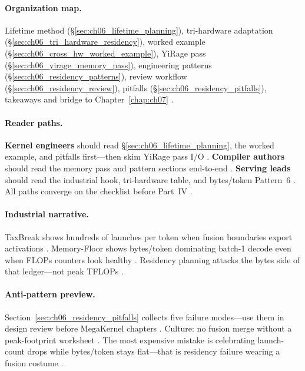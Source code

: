 \paragraph{Organization map.}
Lifetime method (\S\ref{sec:ch06_lifetime_planning}), tri-hardware adaptation (\S\ref{sec:ch06_tri_hardware_residency}), worked example (\S\ref{sec:ch06_cross_hw_worked_example}), YiRage pass (\S\ref{sec:ch06_yirage_memory_pass}), engineering patterns (\S\ref{sec:ch06_residency_patterns}), review workflow (\S\ref{sec:ch06_residency_review}), pitfalls (\S\ref{sec:ch06_residency_pitfalls}), takeaways and bridge to Chapter~\ref{chap:ch07} \citep{patel2025llminference}.

\paragraph{Reader paths.}
\textbf{Kernel engineers} should read \S\ref{sec:ch06_lifetime_planning}, the worked example, and pitfalls first---then skim YiRage pass I/O \citep{yirage2026,dao2022flashattention}.
\textbf{Compiler authors} should read the memory pass and pattern sections end-to-end \citep{wu2024mirage,rotem2018glow,chen2020compilerbasedhardw}.
\textbf{Serving leads} should read the industrial hook, tri-hardware table, and bytes/token Pattern~6 \citep{patel2025llminference,memoryfloor2026,taxbreak2026}.
All paths converge on the checklist before Part~IV \citep{mpk2025,yirage2026}.

\paragraph{Industrial narrative.}
TaxBreak shows hundreds of launches per token when fusion boundaries export activations \citep{taxbreak2026}.
Memory-Floor shows bytes/token dominating batch-1 decode even when FLOPs counters look healthy \citep{memoryfloor2026}.
Residency planning attacks the bytes side of that ledger---not peak TFLOPs \citep{dao2022flashattention,patel2025llminference}.

\paragraph{Anti-pattern preview.}
Section~\ref{sec:ch06_residency_pitfalls} collects five failure modes---use them in design review before MegaKernel chapters \citep{yirage2026,taxbreak2026}.
Culture: no fusion merge without a peak-footprint worksheet \citep{chen2020compilerbasedhardw,memoryfloor2026}.
The most expensive mistake is celebrating launch-count drops while bytes/token stays flat---that is residency failure wearing a fusion costume \citep{taxbreak2026,patel2025llminference,memoryfloor2026}.

